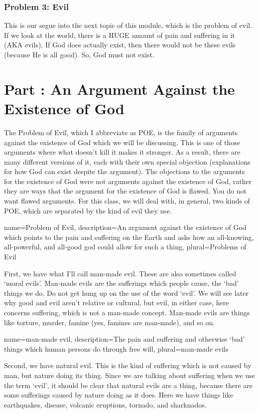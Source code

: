 \subsection{Problem 3: Evil}
This is our segue into the next topic of this module, which is the problem of evil. If we look at the world, there is a HUGE amount of pain and suffering in it (AKA evils). If God does actually exist, then there would not be these evils (because He is all good). So, God must not exist. 
\chapter{Part \thechapcount: An Argument Against the Existence of God}\setcounter{seccount}{1}

The \gls{Problem of Evil}, which I abbreviate as POE, is the family of arguments against the existence of God which we will be discussing. This is one of those arguments where what doesn't kill it makes it stronger. As a result, there are many different versions of it, each with their own special objection (explanations for how God can exist despite the argument). The objections to the arguments for the existence of God were not arguments against the existence of God, rather they are ways that the argument for the existence of God is flawed. You do not want flawed arguments. For this class, we will deal with, in general, two kinds of POE, which are separated by the kind of evil they use. 

{
name=Problem of Evil,
description={An argument against the existence of God which points to the pain and suffering on the Earth and asks how an all-knowing, all-powerful, and all-good god could allow for such a thing},
plural=Problems of Evil
}


First, we have what I'll call \gls{man-made evil}. These are also sometimes called `moral evils'. Man-made evils are the sufferings which people cause, the `bad' things we do. Do not get hung up on the use of the word `evil'. We will see later why good and evil aren't relative or cultural, but evil, in either case, here concerns suffering, which is not a man-made concept. Man-made evils are things like torture, murder, famine (yes, famines are man-made), and so on. 

{
name=man-made evil,
description={The pain and suffering and otherwise `bad' things which human persons do through free will},
plural=man-made evils
}


Second, we have \gls{natural evil}. This is the kind of suffering which is not caused by man, but nature doing its thing. Since we are talking about suffering when we use the term `evil', it should be clear that natural evils are a thing, because there are some sufferings caused by nature doing as it does. Here we have things like earthquakes, disease, volcanic eruptions, tornado, and sharknados. 

